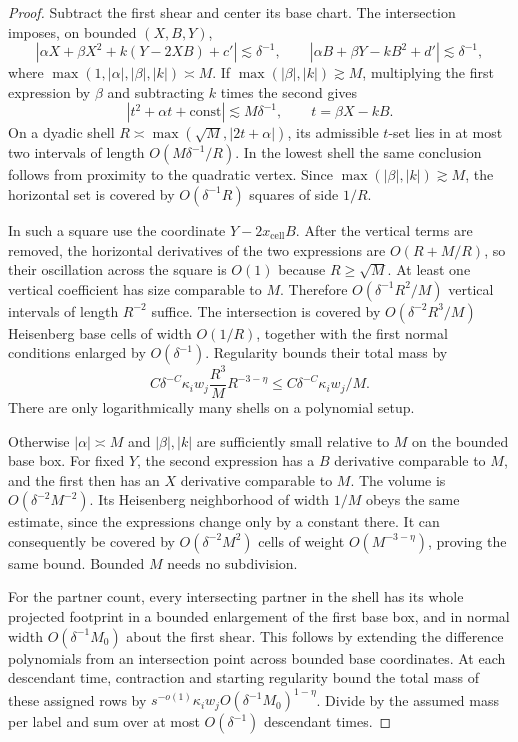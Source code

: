 \begin{proof}
Subtract the first shear and center its base chart.  The intersection
imposes, on bounded $(X,B,Y)$,
\[
 |\alpha X+\beta X^2+k(Y-2XB)+c'|\lesssim\delta^{-1},\qquad
 |\alpha B+\beta Y-kB^2+d'|\lesssim\delta^{-1},
\]
where $\max(1,|\alpha|,|\beta|,|k|)\asymp M$.
If $\max(|\beta|,|k|)\gtrsim M$, multiplying the first expression by
$\beta$ and subtracting $k$ times the second gives
\[
 |t^2+\alpha t+\mathrm{const}|\lesssim M\delta^{-1},
 \qquad t=\beta X-kB.
\]
On a dyadic shell $R\asymp\max(\sqrt M,|2t+\alpha|)$, its admissible
$t$-set lies in at most two intervals of length $O(M\delta^{-1}/R)$.
In the lowest shell the same conclusion follows from proximity to the
quadratic vertex.  Since $\max(|\beta|,|k|)\gtrsim M$, the horizontal
set is covered by $O(\delta^{-1}R)$ squares of side $1/R$.

In such a square use the coordinate $Y-2x_{\mathrm{cell}}B$.
After the vertical terms are removed, the horizontal derivatives of the
two expressions are $O(R+M/R)$, so their oscillation across the square
is $O(1)$ because $R\ge\sqrt M$.  At least one vertical coefficient has
size comparable to $M$.  Therefore
$O(\delta^{-1}R^2/M)$ vertical intervals of length $R^{-2}$ suffice.
The intersection is covered by
$O(\delta^{-2}R^3/M)$ Heisenberg base cells of width $O(1/R)$, together
with the first normal conditions enlarged by $O(\delta^{-1})$.
Regularity bounds their total mass by
\[
 C\delta^{-C}\kappa_i w_j
       \frac{R^3}{M}R^{-3-\eta}
       \le C\delta^{-C}\kappa_iw_j/M.
\]
There are only logarithmically many shells on a polynomial setup.

Otherwise $|\alpha|\asymp M$ and $|\beta|,|k|$ are sufficiently small
relative to $M$ on the bounded base box.  For fixed $Y$, the second
expression has a $B$ derivative comparable to $M$, and the first then
has an $X$ derivative comparable to $M$.  The volume is
$O(\delta^{-2}M^{-2})$.  Its Heisenberg neighborhood of width $1/M$
obeys the same estimate, since the expressions change only by a constant
there.  It can consequently be covered by
$O(\delta^{-2}M^2)$ cells of weight $O(M^{-3-\eta})$, proving the same
bound.  Bounded $M$ needs no subdivision.

For the partner count, every intersecting partner in the shell has its
whole projected footprint in a bounded enlargement of the first base
box, and in normal width $O(\delta^{-1}M_0)$ about the first shear.
This follows by extending the difference polynomials from an intersection
point across bounded base coordinates.  At each descendant time,
contraction and starting regularity bound the total mass of these
assigned rows by
$s^{-o(1)}\kappa_i w_j O(\delta^{-1}M_0)^{1-\eta}$.
Divide by the assumed mass per label and sum over at most $O(\delta^{-1})$
descendant times.
\end{proof}

